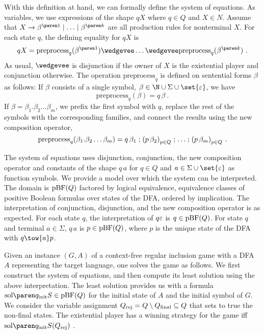\documentclass[../../diss.tex]{subfiles}
\begin{document}
With this definition at hand, we can formally define the system of equations.
As variables, we use expressions of the shape $qX$ where $q \in Q$ and $X \in N$.
Assume that $X \to \itr{\beta}{1} \mid \ldots \mid \itr{\beta}{k}$ are all production rules for nonterminal $X$.
For each state $q$, the defining equality for $qX$ is
\[
    qX = \text{preprocess}_q(\itr{\beta}{1}) \wedgevee \ldots \wedgevee \text{preprocess}_q(\itr{\beta}{k})
    \ .
\]
As usual, $\wedgevee$ is disjunction if the owner of $X$ is the existential player and conjunction otherwise.
The operation $\text{preprocess}_q$ is defined on sentential forms $\beta$ as follows:
If $\beta$ consists of a single symbol, $\beta \in \N \cup \Sigma \cup \set{\eps}$, we have
\[
    \text{preprocess}_q(\beta) = q\,\beta
    \ .
\]
If $\beta = \beta_1.\beta_2 \ldots \beta_m$, we prefix the first symbol with $q$, replace the rest of the symbols with the corresponding families, and connect the results using the new composition operator,
\[
    \text{preprocess}_q(\beta_1.\beta_2 \ldots \beta_m) = q\,\beta_1 \mathrel{;} {(p \, \beta_2)}_{p \in Q} \mathrel{;} \ldots \mathrel{;} {(p \, \beta_m)}_{p \in Q}
    \ .
\]

The system of equations uses disjunction, conjunction, the new composition operator and constants of the shape $q \, a$ for $q \in Q$ and $a \in \Sigma \cup \set{\eps}$ as function symbols.
We provide a model over which the system can be interpreted.
The domain is $\text{pBF}(Q)$ factored by logical equivalence, \ie equivalence classes of positive Boolean formulas over states of the DFA, ordered by implication.
The interpretation of conjunction, disjunction, and the new composition operator is as expected.
For each state $q$, the interpretation of $q \varepsilon$ is $q \in \text{pBF}(Q)$.
For state $q$ and terminal $a \in \Sigma$, $q \,  a$ is $p \in \text{pBF}(Q)$, where $p$ is the unique state of the DFA with $q \tow{a} p$.

Given an instance $(G,A)$ of a context-free regular inclusion game with a DFA $A$ representing the target language, one solves the game as follows.
We first construct the system of equations, and then compute its least solution using the above interpretation.
The least solution provides us with a formula $\sol{ \qinit S} \in \pBF(Q)$ for the initial state of $A$ and the initial symbol of $G$.
We consider the variable assignment $Q_{\text{rej}} = Q \setminus Q_{\text{final}} \subseteq Q$ that sets to true the non-final states.
The existential player has a winning strategy for the game iff $\sol{ \qinit S}(Q_{\text{rej}})$ .
\end{document}
